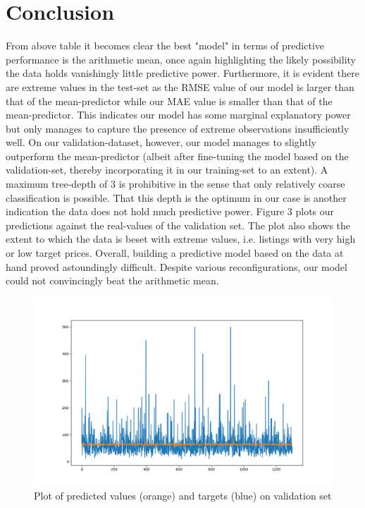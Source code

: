\documentclass[11pt, oneside]{article}   	%
\begin{document}
\section{Conclusion}
From above table it becomes clear the best "model" in terms of predictive performance is the arithmetic mean, once again highlighting the likely possibility the data holds vanishingly little predictive power.
\newline
Furthermore, it is evident there are extreme values in the test-set as the RMSE value of our model is larger than that of the mean-predictor while our MAE value is smaller than that of the mean-predictor. This indicates our model has some marginal explanatory power but only manages to capture the presence of extreme observations insufficiently well. On our validation-dataset, however, our model manages to slightly outperform the mean-predictor (albeit after fine-tuning the model based on the validation-set, thereby incorporating it in our training-set to an extent).\newline
A maximum tree-depth of 3 is prohibitive in the sense that only relatively coarse classification is possible. That this depth is the optimum in our case is another indication the data does not hold much predictive power. Figure 3 plots our predictions against the real-values of the validation set. The plot also shows the extent to which the data is beset with extreme values, i.e. listings with very high or low target prices.\newline
Overall, building a predictive model based on the data at hand proved astoundingly difficult. Despite various reconfigurations, our model could not convincingly beat the arithmetic mean.




\begin{figure}[h]

\centering
	\includegraphics[width=1\linewidth]{PredsVSValids}
\caption{Plot of predicted values (orange) and targets (blue) on validation set}
\label{figure label}
\end{figure}
\end{document}
